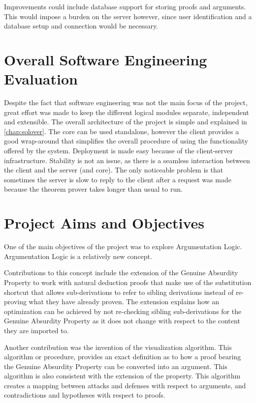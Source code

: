 \documentclass[11pt,twoside,a4paper]{report}
\begin{document}
Improvements could include database support for storing proofs and arguments. This would impose a burden on the server however, since user identification and a database setup and connection would be necessary.

\section{Overall Software Engineering Evaluation}
Despite the fact that software engineering was not the main focus of the project, great effort was made to keep the different logical modules separate, independent and extensible. The overall architecture of the project is simple and explained in \autoref{chap:solover}. The core can be used standalone, however the client provides a good wrap-around that simplifies the overall procedure of using the functionality offered by the system. Deployment is made easy because of the client-server infrastructure. Stability is not an issue, as there is a seamless interaction between the client and the server (and core). The only noticeable problem is that sometimes the server is slow to reply to the client after a request was made because the theorem prover takes longer than usual to run.

\section{Project Aims and Objectives}
One of the main objectives of the project was to explore Argumentation Logic. Argumentation Logic is a relatively new concept. 

Contributions to this concept include the extension of the Genuine Absurdity Property to work with natural deduction proofs that make use of the substitution shortcut that allows sub-derivations to refer to sibling derivations instead of re-proving what they have already proven. The extension explains how an optimization can be achieved by not re-checking sibling sub-derivations for the Genuine Absurdity Property as it does not change with respect to the content they are imported to.

Another contribution was the invention of the visualization algorithm. This algorithm or procedure, provides an exact definition as to how a proof bearing the Genuine Absurdity Property can be converted into an argument. This algorithm is also consistent with the extension of the property. This algorithm creates a mapping between attacks and defenses with respect to arguments, and contradictions and hypotheses with respect to proofs.
\end{document}

